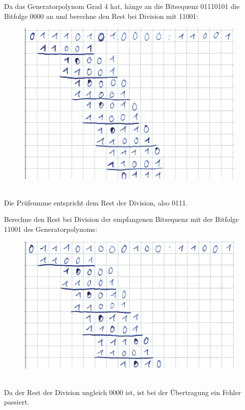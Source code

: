 \documentclass{../exercisesheet}
\begin{document}
\begin{exercise}{4}
	\begin{subexercise}
	Da das Generatorpolynom Grad 4 hat, hänge an die Bitsequenz 01110101 die Bitfolge 0000 an und berechne den Rest bei Division mit 11001:
	\begin{figure}[h]
 		\centering
		\includegraphics{3_6a.png}
	\end{figure}\ \\
	Die Prüfsumme entspricht dem Rest der Division, also 0111.
	\end{subexercise}
	
	\begin{subexercise}
	Berechne den Rest bei Division der empfangenen Bitsequenz mit der Bitfolge 11001 des Generatorpolynoms:
	\begin{figure}[h]
 		\centering
		\includegraphics{3_6b.png}
	\end{figure}\ \\
	Da der Rest der Division ungleich 0000 ist, ist bei der Übertragung ein Fehler passiert.
	\end{subexercise}


\end{exercise}
\end{document}
